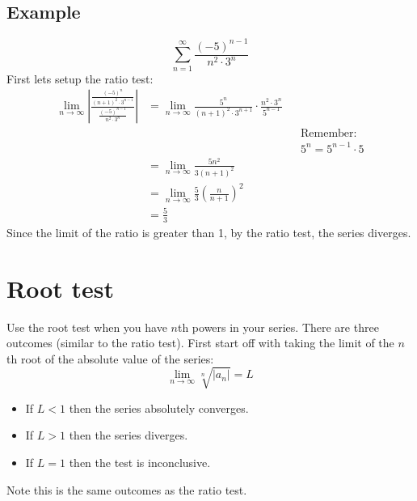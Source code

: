 \documentclass{report}
\begin{document}
    \subsection{Example}
        \[\sum_{n = 1}^{\infty} \frac{(-5)^{n-1}}{n^2 \cdot 3^n} \]
        First lets setup the ratio test:
        \begin{align*}
            \lim_{n \to \infty} \left| \frac{\frac{(-5)^n}{(n+1)^2 \cdot 3^{n-1}}}{\frac{(-5)^{n-1}}{n^2 \cdot 3^n}} \right|
            &= \lim_{n \to \infty} \frac{5^n}{(n+1)^2 \cdot 3^{n+1}} \cdot \frac{n^2 \cdot 3^n}{5^{n-1}} \\
            && &\text{Remember:} \\
            && & 5^n = 5^{n-1} \cdot 5 \\
            &= \lim_{n \to \infty} \frac{5n^2}{3(n+1)^2} \\
            &= \lim_{n \to \infty} \frac{5}{3} \left(\frac{n}{n+1}\right)^2 \\
            &= \frac{5}{3}
        \end{align*}
        Since the limit of the ratio is greater than 1, by the ratio test, the series diverges.

\section{Root test}
    Use the root test when you have \(n\)th powers in your series. There are three outcomes (similar to the ratio test).
    First start off with taking the limit of the \(n\)th root of the absolute value of the series:
    \[\lim_{n \to \infty} \sqrt[n]{\left| a_n \right|} = L\] 
    \begin{itemize}
        \item If \(L < 1\) then the series absolutely converges.
        \item If \(L > 1\) then the series diverges.
        \item If \(L = 1\) then the test is inconclusive.
    \end{itemize}
    Note this is the same outcomes as the ratio test.
    
\end{document}

